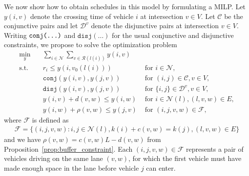 \documentclass[a4paper]{article}
\theoremstyle{definition}
\theoremstyle{plain}
\newtheorem{proposition}{Proposition}
\begin{document}
We now show how to obtain schedules in this model by formulating a MILP. Let
$y(i,v)$ denote the crossing time of vehicle $i$ at intersection $v \in V$. Let
$\mathcal{C}$ be the conjunctive pairs and let $\mathcal{D}^{v}$ denote the
disjunctive pairs at intersection $v \in V$.
%
Writing $\texttt{conj(\dots)}$ and $\texttt{disj}(\dots)$ for the usual conjunctive and disjunctive
constraints, we propose to solve the optimization problem
\begin{subequations}\label{eq:network_problem}
\begin{align}
  \min_{y} \quad & \sum_{i \in \mathcal{N}} \sum_{v \in \mathcal{R}(l(i))} y(i,v) & \\
  \text{s.t.} \quad & r_{i} \leq y(i, v_{0}(l(i))) & \text{ for } i \in \mathcal{N} , \\
  & \texttt{conj}(y(i,v), y(j,v)) & \text{ for } (i,j) \in \mathcal{C}, v \in V , \\
  & \texttt{disj}(y(i,v), y(j,v)) & \text{ for } \{i,j\} \in \mathcal{D}^{v}, v \in V , \\
  & y(i, v) + d(v, w) \leq y(i, w) & \text{ for } i \in \mathcal{N}(l), (l, v, w) \in E, \label{eq:travel_delay} \\
  & y(i, w) + \rho(v, w) \leq y(j, v) & \text{ for } (i,j,v,w) \in \mathcal{F} , \label{eq:buffer_constraints}
\end{align}
\end{subequations}
where $\mathcal{F}$ is defined as
\begin{align*}
  \mathcal{F} = \{ (i,j,v,w) : i,j \in \mathcal{N}(l), k(i) + c(v,w) = k(j),  (l,v,w) \in E\}
\end{align*}
and we have $\rho(v, w) = c(v, w) L - d(v, w)$ from Proposition~\ref{prop:buffer_constraint}. Each
$(i,j,v,w) \in \mathcal{F}$ represents a pair of vehicles driving on the same lane
$(v,w)$, for which the first vehicle must have made enough space in the lane
before vehicle $j$ can enter.
%
%
%
\end{document}
